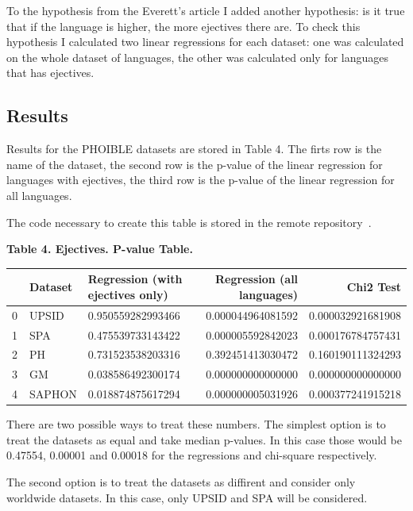 \documentclass[a4paper,12pt]{article}
\begin{document}
To the hypothesis from the Everett's article I added another hypothesis: is it true that if the language is higher, the more ejectives there are. To check this hypothesis I calculated two linear regressions for each dataset: one was calculated on the whole dataset of languages, the other was calculated only for languages that has ejectives.

\subsection{Results}

Results for the PHOIBLE datasets are stored in Table 4. The firts row is the name of the dataset, the second row is the p-value of the linear regression for languages with ejectives, the third row is the p-value of the linear regression for all languages.

The code necessary to create this table is stored in the remote repository~\parencite{lingtypologyResearch}.

\textbf{Table 4. Ejectives. P-value Table.}

\begin{adjustbox}{max width=\textwidth}
\begin{tabular}{ l | l | l | r | r }
    ~  & Dataset  & Regression (with ejectives only)  & Regression (all languages)  & Chi2 Test \\
    \hline
    0  & UPSID  & 0.950559282993466  & 0.000044964081592  & 0.000032921681908 \\
    1  & SPA  & 0.475539733143422  & 0.000005592842023  & 0.000176784757431 \\
    2  & PH  & 0.731523538203316  & 0.392451413030472  & 0.160190111324293 \\
    3  & GM  & 0.038586492300174  & 0.000000000000000  & 0.000000000000000 \\
    4  & SAPHON  & 0.018874875617294  & 0.000000005031926  & 0.000377241915218 \\
    \hline
\end{tabular}
\end{adjustbox}
\bigskip

There are two possible ways to treat these numbers. The simplest option is to treat the datasets as equal and take median p-values. In this case those would be 0.47554, 0.00001 and 0.00018 for the regressions and chi-square respectively.

The second option is to treat the datasets as diffirent and consider only worldwide datasets. In this case, only UPSID and SPA will be considered.
\end{document}
